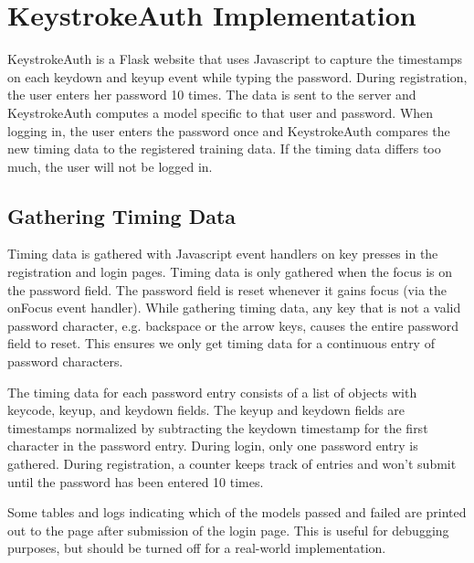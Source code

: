 \documentclass{article}
\begin{document}
\section{KeystrokeAuth Implementation}
KeystrokeAuth is a Flask website that uses Javascript to capture the timestamps on each keydown and keyup event while typing the password.
During registration, the user enters her password 10 times.
The data is sent to the server and KeystrokeAuth computes a model specific to that user and password.
When logging in, the user enters the password once and KeystrokeAuth compares the new timing data to the registered training data.
If the timing data differs too much, the user will not be logged in.

\subsection{Gathering Timing Data}
Timing data is gathered with Javascript event handlers on key presses in the registration and login pages.
Timing data is only gathered when the focus is on the password field. The password field is reset whenever it gains focus (via the onFocus event handler).  
While gathering timing data, any key that is not a valid password character, e.g. backspace or the arrow keys, causes the entire password field to reset.
This ensures we only get timing data for a continuous entry of password characters.

The timing data for each password entry consists of a list of objects with keycode, keyup, and keydown fields. The keyup and keydown fields are timestamps normalized by subtracting the keydown timestamp for the first character in the password entry. 
During login, only one password entry is gathered. During registration, a counter keeps track of entries and won't submit until the password has been entered 10 times.

Some tables and logs indicating which of the models passed and failed are printed out to the page after submission of the login page. 
This is useful for debugging purposes, but should be turned off for a real-world implementation.
\end{document}

